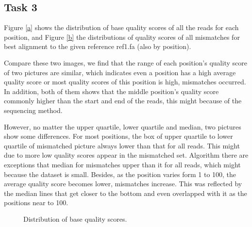 \documentclass[a4paper]{article}
\begin{document}
\subsection{Task 3}

Figure \ref{a}  shows the distribution of base quality scores of all the reads for each position, and Figure \ref{b} the distributions of quality scores of all mismatches for best alignment to the given reference ref1.fa  (also by position). 

Compare these two images, we find that the range of each position's quality score of two pictures are similar, which indicates even a position has a high average quality score or most quality scores of this position is high, mismatches occurred.  In addition, both of them shows that the middle position's quality score commonly higher than the start and end of the reads, this might because of the sequencing method.

However, no matter the upper quartile, lower quartile and median, two pictures show some differences. For most positions, the box of upper quartile to lower quartile of mismatched picture always lower than that for all reads. This might due to more low quality scores appear in the mismatched set.  Algorithm there are exceptions that median for mismatches upper than it for all reads, which might because the dataset is small. Besides, as the position varies form 1 to 100, the average quality score becomes lower, mismatches increase. This was reflected by the median lines that get closer to the bottom and even overlapped with it as the positions near to 100.

\begin{figure}[!htb]
	\centering
	\caption{Distribution of base quality scores.}
	\label{fig:2} 
\end{figure}
 


\end{document}
